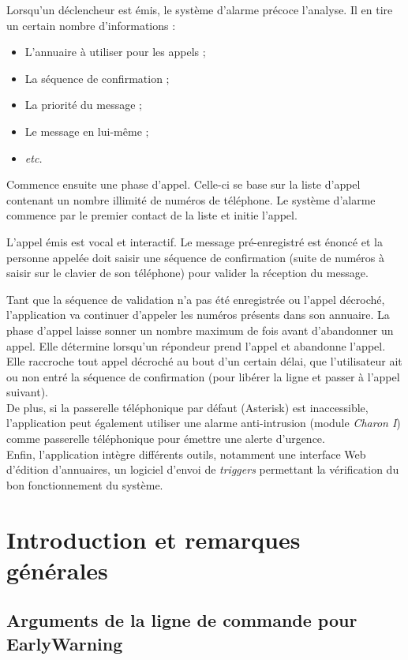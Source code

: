 \documentclass{article}
\begin{document}
Lorsqu'un déclencheur est émis, le système d'alarme précoce l'analyse. Il en tire un certain nombre d'informations : 
\begin{itemize}
    \item L'annuaire à utiliser pour les appels ;
    \item La séquence de confirmation ;
    \item La priorité du message ;
    \item Le message en lui-même ;
    \item \emph{etc.}
\end{itemize}

Commence ensuite une phase d'appel. Celle-ci se base sur la liste d'appel contenant un nombre illimité de numéros de téléphone. Le système d'alarme commence par le premier contact de la liste et initie l'appel.

L'appel émis est vocal et interactif. Le message pré-enregistré est énoncé et la personne appelée doit saisir une séquence de confirmation (suite de numéros à saisir sur le clavier de son téléphone) pour valider la réception du message.

Tant que la séquence de validation n'a pas été enregistrée ou l'appel décroché, l'application va continuer d'appeler les numéros présents dans son annuaire. La phase d'appel laisse sonner un nombre maximum de fois avant d'abandonner un appel. Elle détermine lorsqu'un répondeur prend l'appel et abandonne l'appel. Elle raccroche tout appel décroché au bout d'un certain délai, que l'utilisateur ait ou non entré la séquence de confirmation (pour libérer la ligne et passer à l'appel suivant).\\

De plus, si la passerelle téléphonique par défaut (Asterisk) est inaccessible, l'application peut également utiliser une alarme anti-intrusion (module \emph{Charon I}) comme passerelle téléphonique pour émettre une alerte d'urgence.\\

Enfin, l'application intègre différents outils, notamment une interface Web d'édition d'annuaires, un logiciel d'envoi de \emph{triggers} permettant la vérification du bon fonctionnement du système.

\pagebreak
\section{Introduction et remarques générales}

\subsection{Arguments de la ligne de commande pour EarlyWarning}
\end{document}
